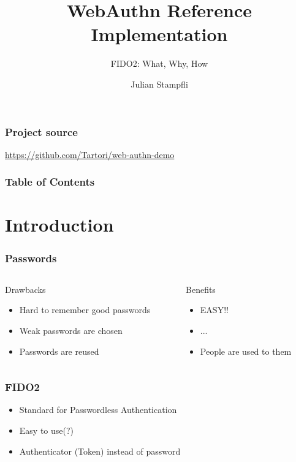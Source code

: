 \documentclass{beamer}
\begin{document}
\title{WebAuthn Reference Implementation}
\subtitle{FIDO2: What, Why, How}
\author{Julian Stampfli}

\frame{\titlepage}

\begin{frame}
  \frametitle{Project source}
  \url{https://github.com/Tartori/web-authn-demo}
\end{frame}

\begin{frame}
  \frametitle{Table of Contents}
  \tableofcontents
\end{frame}

\section{Introduction}

\begin{frame}[fragile]
  \frametitle{Passwords}
  \begin{columns}
    \begin{column}{0.5\textwidth}
      Drawbacks
      \begin{itemize}
        \item Hard to remember good passwords
        \item Weak passwords are chosen
        \item Passwords are reused
      \end{itemize}
    \end{column}
    \pause
    \begin{column}{0.5\textwidth}
      Benefits
      \begin{itemize}
        \item EASY!!
        \item ...
        \pause
        \item People are used to them
      \end{itemize}
    \end{column}
  \end{columns}
\end{frame}

\begin{frame}[fragile]
  \frametitle{FIDO2}
  \begin{itemize}
    \item Standard for Passwordless Authentication
    \item Easy to use(?)
    \pause
    \item Authenticator (Token) instead of password
  \end{itemize}
\end{frame}
\end{document}
